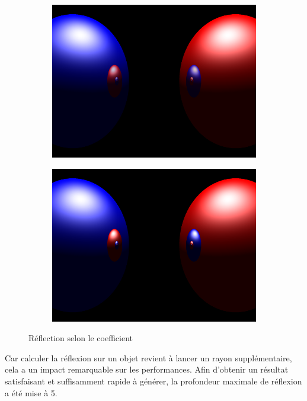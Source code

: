 \documentclass{article}
\begin{document}
\begin{figure}[hb]
  \begin{subfigure}{0.45\textwidth}
    \includegraphics[width=1\textwidth]{images/refl075.png}
  \end{subfigure}
  \begin{subfigure}{0.45\textwidth}
    \includegraphics[width=1\textwidth]{images/refl1.png}
  \end{subfigure}
  \caption{Réflection selon le coefficient\label{refl}}
\end{figure}

Car calculer la réflexion sur un objet revient à lancer un rayon
supplémentaire, cela a un impact remarquable sur les performances. Afin
d'obtenir un résultat satisfaisant et suffisamment rapide à générer, la
profondeur maximale de réflexion a été mise à 5.
\end{document}
